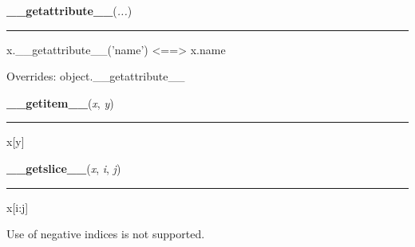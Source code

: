     \vspace{0.5ex}

    \begin{boxedminipage}{\textwidth}

    \raggedright \textbf{\_\_getattribute\_\_}(\textit{...})

    \vspace{-1.5ex}

    \rule{\textwidth}{0.5\fboxrule}
    x.\_\_getattribute\_\_('name') {\textless}=={\textgreater} x.name

    \vspace{1ex}

      Overrides: object.\_\_getattribute\_\_

    \end{boxedminipage}

    \label{exceptions:BaseException:__getitem__}

    \vspace{0.5ex}

    \begin{boxedminipage}{\textwidth}

    \raggedright \textbf{\_\_getitem\_\_}(\textit{x}, \textit{y})

    \vspace{-1.5ex}

    \rule{\textwidth}{0.5\fboxrule}
    x[y]

    \vspace{1ex}

    \end{boxedminipage}

    \label{exceptions:BaseException:__getslice__}

    \vspace{0.5ex}

    \begin{boxedminipage}{\textwidth}

    \raggedright \textbf{\_\_getslice\_\_}(\textit{x}, \textit{i}, \textit{j})

    \vspace{-1.5ex}

    \rule{\textwidth}{0.5\fboxrule}
    x[i:j]

    Use of negative indices is not supported.

    \vspace{1ex}

    \end{boxedminipage}

